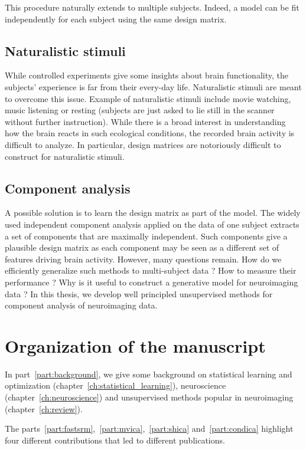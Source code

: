 \documentclass[ twoside,openright,titlepage,numbers=noenddot,%
                headinclude,footinclude,cleardoublepage=empty,abstract=on,
                BCOR=5mm,paper=a4,fontsize=11pt, 
                ]{scrreprt}
\begin{document}
This procedure naturally extends to multiple subjects. Indeed, a model can be
fit independently for each subject using the same design matrix.

\subsection{Naturalistic stimuli}
While controlled experiments give some insights about brain functionality,
the subjects' experience is far from their every-day life.
Naturalistic stimuli are meant to overcome this issue. Example of naturalistic stimuli include movie watching, music listening or resting (subjects are just asked to lie still in the scanner without further instruction).
While there is a broad interest in understanding
how the brain reacts in such ecological conditions, the recorded brain activity
is difficult to analyze. In particular, design matrices are notoriously difficult
to construct for naturalistic stimuli.

\subsection{Component analysis}
A possible solution is to learn the design matrix as part of the model.
The widely used independent component analysis applied on the data of one
subject extracts a set of components that are
maximally independent. Such components give a plausible design matrix as each
component may be seen as a different set of features driving brain activity.
However, many questions remain. How do we efficiently generalize such methods to
multi-subject data ? How to measure their performance ? Why is it useful to
construct a generative model for neuroimaging data ?
In this thesis, we develop well principled unsupervised methods for component
analysis of neuroimaging data.

\section{Organization of the manuscript}
In part~\ref{part:background}, we give some background on statistical learning
and optimization (chapter~\ref{ch:statistical_learning}), neuroscience
(chapter~\ref{ch:neuroscience}) and unsupervised methods popular in neuroimaging (chapter~\ref{ch:review}).

The parts~\ref{part:fastsrm},~\ref{part:mvica},~\ref{part:shica}
and~\ref{part:condica} highlight four different contributions that led to
different publications.
\end{document}
